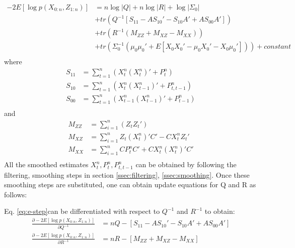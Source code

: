 \documentclass{article}
\begin{document}
\begin{equation}
\begin{split}\label{eq:e-step}
     -2E[\log p(X_{0:n},Z_{1:n})] &=n\log |Q|+n\log|R| + \log|\Sigma_0|\\
     &+ tr(Q^{-1}[S_{11}-AS_{10}'-S_{10}A'+AS_{00}A']) \\ 
 &+ tr(R^{-1}(M_{ZZ}+M_{XZ}-M_{XX}))\\
 &+ tr(\Sigma_0^{-1}(\mu_0\mu_0'+E[X_0X_0'-\mu_0X_0'-X_0\mu_0'])) +constant\\
\end{split}
\end{equation}
where
\begin{equation}\label{eq:s_calc}
\begin{split}
    S_{11} &= \sum_{t=1}^n(X_t^n(X_t^{n})'+P_t^n) \\
    S_{10} &= \sum_{t=1}^n(X_t^n(X_{t-1}^n)'+P_{t,t-1}^n) \\ 
    S_{00} &= \sum_{t=1}^n(X_{t-1}^n(X_{t-1}^n)'+P_{t-1}^n) \\
\end{split}
\end{equation}
and
\begin{equation}\label{eq:m_calc}
    \begin{split}
    M_{ZZ} &= \sum_{i=1}^n(Z_tZ_t')\\
    M_{XZ} &= \sum_{i=1}^n Z_t(X_t^n)'C'-CX_t^nZ_t'\\
    M_{XX} &= \sum_{i=1}^n CP_t^nC'+CX_t^n(X_t^n)'C'\\
    \end{split}
\end{equation}
All the smoothed estimates $X_t^n,P_t^n,P_{t,t-1}^n$ can be obtained by following the filtering, smoothing steps in section \ref{ssec:filtering}, \ref{ssec:smoothing}. Once these smoothing steps are substituted, one can obtain update equations for Q and R as follows:

Eq. \ref{eq:e-step}can be differentiated with respect to $Q^{-1}$ and $R^{-1}$ to obtain:
\begin{equation}
\begin{split}
\frac{\partial  -2E[\log p(X_{0:n},Z_{1:n})]}{\partial Q^{-1}} &= nQ -[S_{11}-AS_{10}'-S_{10}A'+AS_{00}A'] \\
\frac{\partial -2E[\log p(X_{0:n},Z_{1:n})]}{\partial R^{-1}} &= nR - [M_{ZZ}+M_{XZ}-M_{XX}]
\end{split}
\end{equation}
\end{document}
